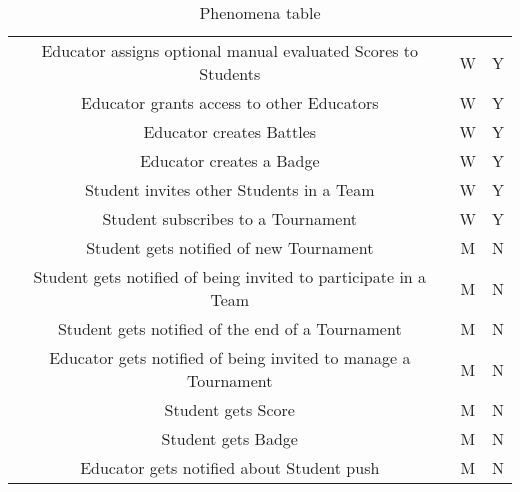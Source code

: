 \begin{center}
\begin{table}[h]
\begin{tabularx}{\textwidth}{| c| c| c|}
            Educator assigns optional manual evaluated Scores to Students         & W                & Y          \\
            Educator grants access to other Educators                             & W                & Y          \\
            Educator creates Battles                                              & W                & Y          \\
            Educator creates a Badge                                              & W                & Y          \\
            Student invites other Students in a Team                              & W                & Y          \\
            Student subscribes to a Tournament                                    & W                & Y          \\
            Student gets notified of new Tournament                               & M                & N          \\
            Student gets notified of being invited to participate in a Team       & M                & N          \\
            Student gets notified of the end of a Tournament                      & M                & N          \\
            Educator gets notified of being invited to manage a Tournament        & M                & N          \\
            Student gets Score                                                    & M                & N          \\
            Student gets Badge                                                    & M                & N          \\
            Educator gets notified about Student push                             & M                & N          \\
            \hline
        \end{tabularx}
        \caption{Phenomena table}
    \end{table}
\end{center}

